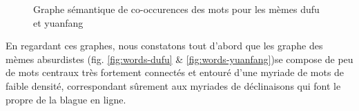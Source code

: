 \begin{figure}[h!t]
    \centering
    
  \caption{
    Graphe s\'emantique de co-occurences des mots pour les m\`emes dufu et yuanfang   
  }
\end{figure}

En regardant ces graphes, nous constatons tout d{\textquoteright}abord que les graphe des m\`emes absurdistes (fig. \ref{fig:words-dufu} \& \ref{fig:words-yuanfang})se compose de peu de mots centraux tr\`es fortement connect\'es et entour\'e d{\textquoteright}une myriade de mots de faible densit\'e, correspondant s\^urement aux myriades de d\'eclinaisons qui font le propre de la blague en ligne.  

